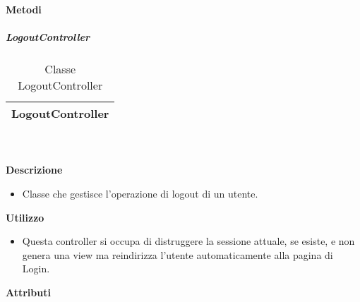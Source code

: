 		\textbf{Metodi} 
	\begin{itemize}
		\end{itemize}
			\subparagraph{LogoutController} 
\begin{table}[ht]
\begin{center}
\bgroup
	\setlength{\arrayrulewidth}{0.6mm}
	\def\arraystretch{1}
		\begin{tabular}{ | p{12cm} | }
				\hline  
					\centerline{\textbf{LogoutController}}
		\\ \hline 
				\hline
				\hline
		
		\end{tabular}
\egroup
\caption{Classe LogoutController}
\end{center}
\end{table}  \textbf{\\ \\ Descrizione} 
					\begin{itemize}
						\item[] Classe che gestisce l'operazione di logout di un utente.
					\end{itemize}      
				\textbf{Utilizzo}  
					\begin{itemize}
						\item[] Questa controller si occupa di distruggere la sessione attuale, se esiste, e non genera una view ma reindirizza l'utente automaticamente alla pagina di Login.
					\end{itemize}
			 \textbf{Attributi} 
	\begin{itemize}
		\end{itemize}
		
